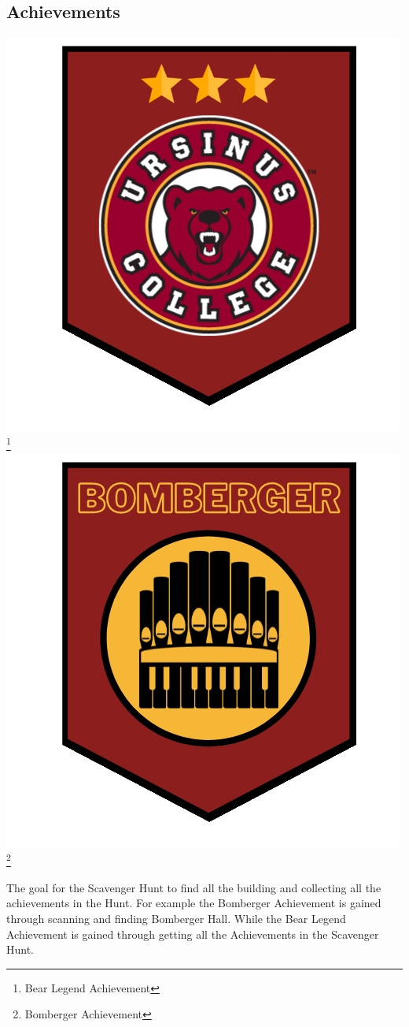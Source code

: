 \documentclass[twoside,twocolumn]{article}
\begin{document}
\subsection{Achievements}
\includegraphics[scale=0.25]{Achievements/Bear Legend.png}\footnote{Bear Legend Achievement}
\includegraphics[scale=0.25]{Achievements/Bomberger.png}\footnote{Bomberger Achievement}
\par The goal for the Scavenger Hunt to find all the building and collecting all the achievements in the Hunt. For example the Bomberger Achievement is gained through scanning and finding Bomberger Hall. While the Bear Legend Achievement is gained through getting all the Achievements\cite{achievements} in the Scavenger Hunt.
\end{document}
